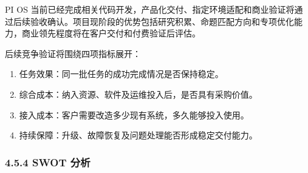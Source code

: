 PI OS 当前已经完成相关代码开发，产品化交付、指定环境适配和商业验证将通过后续验收确认。项目现阶段的优势包括研究积累、命题匹配方向和专项优化能力，商业领先程度将在客户交付和付费验证后评估。

后续竞争验证将围绕四项指标展开：

\begin{enumerate}

\item
  任务效果：同一批任务的成功完成情况是否保持稳定。
\item
  综合成本：纳入资源、软件及运维投入后，是否具有采购价值。
\item
  接入成本：客户需要改造多少现有系统，多久能够投入使用。
\item
  持续保障：升级、故障恢复及问题处理能否形成稳定交付能力。
\end{enumerate}

\subsubsection{4.5.4 SWOT 分析}\label{swot-ux5206ux6790}

